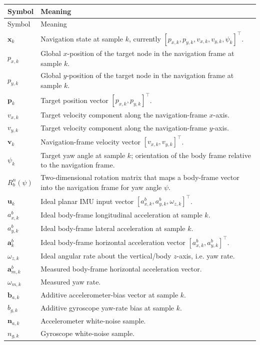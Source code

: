 \begin{longtable}{p{}p{}}
\toprule
Symbol & Meaning\\
\midrule
\endfirsthead
\toprule
Symbol & Meaning\\
\midrule
\endhead
$\bm{x}_k$ & Navigation state at sample $k$, currently $[p_{x,k},p_{y,k},v_{x,k},v_{y,k},\psi_k]^\top$.\\
$p_{x,k}$ & Global $x$-position of the target node in the navigation frame at sample $k$.\\
$p_{y,k}$ & Global $y$-position of the target node in the navigation frame at sample $k$.\\
$\bm{p}_k$ & Target position vector $[p_{x,k},p_{y,k}]^\top$.\\
$v_{x,k}$ & Target velocity component along the navigation-frame $x$-axis.\\
$v_{y,k}$ & Target velocity component along the navigation-frame $y$-axis.\\
$\bm{v}_k$ & Navigation-frame velocity vector $[v_{x,k},v_{y,k}]^\top$.\\
$\psi_k$ & Target yaw angle at sample $k$; orientation of the body frame relative to the navigation frame.\\
$R_b^n(\psi)$ & Two-dimensional rotation matrix that maps a body-frame vector into the navigation frame for yaw angle $\psi$.\\
$\bm{u}_k$ & Ideal planar IMU input vector $[a_{x,k}^b,a_{y,k}^b,\omega_{z,k}]^\top$.\\
$a_{x,k}^b$ & Ideal body-frame longitudinal acceleration at sample $k$.\\
$a_{y,k}^b$ & Ideal body-frame lateral acceleration at sample $k$.\\
$\bm{a}_k^b$ & Ideal body-frame horizontal acceleration vector $[a_{x,k}^b,a_{y,k}^b]^\top$.\\
$\omega_{z,k}$ & Ideal angular rate about the vertical/body $z$-axis, i.e. yaw rate.\\
$\bm{a}_{m,k}^b$ & Measured body-frame horizontal acceleration vector.\\
$\omega_{m,k}$ & Measured yaw rate.\\
$\bm{b}_{a,k}$ & Additive accelerometer-bias vector at sample $k$.\\
$b_{g,k}$ & Additive gyroscope yaw-rate bias at sample $k$.\\
$\bm{n}_{a,k}$ & Accelerometer white-noise sample.\\
$n_{g,k}$ & Gyroscope white-noise sample.\\

\end{longtable}
